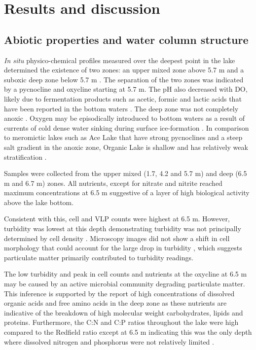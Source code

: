 

\section{Results and discussion}

\subsection{Abiotic properties and water column structure}
\emph{In situ} physico-chemical profiles  measured over the deepest point in the lake  determined the existence of two zones: an upper mixed zone above 5.7 m and a suboxic deep zone below 5.7 m .
The separation of the two zones was indicated by a pycnocline and oxycline starting at 5.7 m. 
The pH also decreased with \ac{DO}, likely due to fermentation products such as acetic, formic and lactic acids that have been reported in the bottom waters \cite{Franzmann1987b, Gibson1994}.
The deep zone was not completely anoxic .
Oxygen may be episodically introduced to bottom waters as a result of currents of cold dense water sinking during surface ice-formation \cite{Ferris1991}.
In comparison to meromictic lakes such as Ace Lake that have strong pycnoclines and a steep salt gradient in the anoxic zone, Organic Lake is shallow and has relatively weak stratification \cite{Gibson1999}. 





Samples were collected from the upper mixed (1.7, 4.2 and 5.7 m) and deep (6.5 m and 6.7 m) zones. 
All nutrients, except for nitrate and nitrite reached maximum concentrations at 6.5 m  suggestive of a layer of high biological activity above the lake bottom. 

Consistent with this, cell and \ac{VLP} counts were highest at 6.5 m. 
However, turbidity was lowest at this depth demonstrating turbidity was not principally determined by cell density . 
Microscopy images did not show a shift in cell morphology that could account for the large drop in turbidity , which suggests particulate matter primarily contributed to turbidity readings. 

The low turbidity and peak in cell counts and nutrients at the oxycline at 6.5 m may be caused by an active microbial community degrading particulate matter. 
This inference is supported by the report of high concentrations of dissolved organic acids and free amino acids in the deep zone \cite{Gibson1994} as these nutrients are indicative of the breakdown of high molecular weight carbohydrates, lipids and proteins. 
Furthermore, the C:N and C:P ratios throughout the lake were high compared to the Redfield ratio \cite{Redfield1963} except at 6.5 m indicating this was the only depth where dissolved nitrogen and phosphorus were not relatively limited .
 
